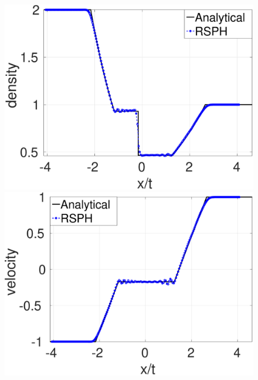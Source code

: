 \begin{figure}
    \centering
    \begin{minipage}{.415\textwidth}
        \centering
        \includegraphics[width=0.99 \textwidth]{./Chapter-4/Figures/double_exp/Dexp-RCM-rho}
    \end{minipage}%
    \begin{minipage}{.415 \textwidth}
        \centering
        \includegraphics[width=0.99 \textwidth]{./Chapter-4/Figures/double_exp/Dexp-RCM-v}
    \end{minipage}%
    \\
    \begin{minipage}{.415\textwidth}
        \centering

\end{minipage}
\end{figure}

